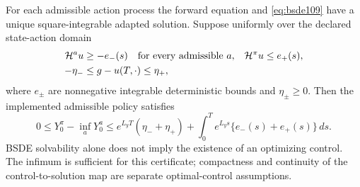 \begin{proposition}\label{prop:bsde109}
For each admissible action process the forward equation and \eqref{eq:bsde109} have a unique square-integrable adapted solution. Suppose uniformly over the declared state-action domain
\begin{align*}
 \mathcal H^a u&\ge-e_-(s)\quad\hbox{for every admissible }a,
 &\mathcal H^{\pi}u&\le e_+(s),\\
 -\eta_-&\le g-u(T,\cdot)\le\eta_+,
\end{align*}
where $e_\pm$ are nonnegative integrable deterministic bounds and $\eta_\pm\ge0$. Then the implemented admissible policy satisfies
\begin{equation}\label{eq:bsdegap109}
 0\le Y_0^\pi-\inf_aY_0^a
 \le e^{L_yT}(\eta_-+\eta_+)
       +\int_0^T e^{L_ys}\{e_-(s)+e_+(s)\}\,ds.
\end{equation}
BSDE solvability alone does not imply the existence of an optimizing control. The infimum is sufficient for this certificate; compactness and continuity of the control-to-solution map are separate optimal-control assumptions.
\end{proposition}

